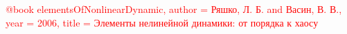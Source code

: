\documentclass[12pt, a4paper]{article}
\newcommand{\comment}[1]{\textcolor{red}{#1}}
\begin{document}
    \tableofcontents

    
    \newpage
    
    \newpage
    
    \newpage
    

    \comment{@book{
  elementsOfNonlinearDynamic,
  author = {Ряшко, Л. Б. and Васин, В. В.},
  year = {2006},
  title = {Элементы нелинейной динамики: от порядка к хаосу}
}}

    
    
\end{document}
